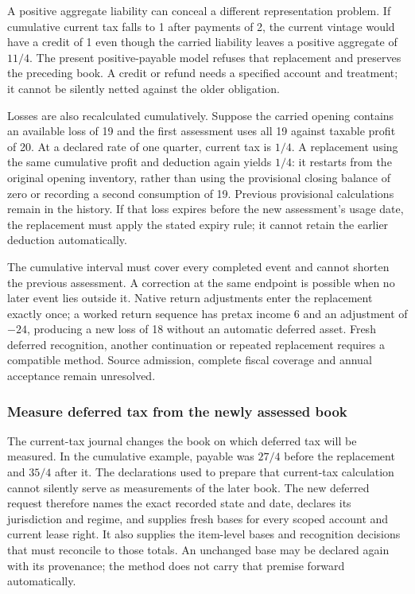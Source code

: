 A positive aggregate liability can conceal a different representation problem.
If cumulative current tax falls to 1 after payments of 2, the current vintage
would have a credit of 1 even though the carried liability leaves a positive
aggregate of $11/4$. The present positive-payable model refuses that replacement
and preserves the preceding book. A credit or refund needs a specified account
and treatment; it cannot be silently netted against the older obligation.

Losses are also recalculated cumulatively. Suppose the carried opening contains
an available loss of 19 and the first assessment uses all 19 against taxable
profit of 20. At a declared rate of one quarter, current tax is $1/4$. A
replacement using the same cumulative profit and deduction again yields $1/4$:
it restarts from the original opening inventory, rather than using the provisional
closing balance of zero or recording a second consumption of 19. Previous
provisional calculations remain in the history. If that loss expires before the
new assessment's usage date, the replacement must apply the stated expiry rule;
it cannot retain the earlier deduction automatically.

The cumulative interval must cover every completed event and cannot shorten the
previous assessment. A correction at the same endpoint is possible when no later
event lies outside it. Native return adjustments enter the replacement exactly
once; a worked return sequence has pretax income 6 and an adjustment of $-24$,
producing a new loss of 18 without an automatic deferred asset. Fresh deferred
recognition, another continuation or repeated replacement requires a compatible
method. Source admission, complete fiscal coverage and annual acceptance remain
unresolved.


\subsubsection*{Measure deferred tax from the newly assessed book}
The current-tax journal changes the book on which deferred tax will be measured.
In the cumulative example, payable was $27/4$ before the replacement and $35/4$
after it. The declarations used to prepare that current-tax calculation cannot
silently serve as measurements of the later book. The new deferred request
therefore names the exact recorded state and date, declares its jurisdiction and
regime, and supplies fresh bases for every scoped account and current lease
right. It also supplies the item-level bases and recognition decisions that
must reconcile to those totals. An unchanged base may be declared again with
its provenance; the method does not carry that premise forward automatically.

